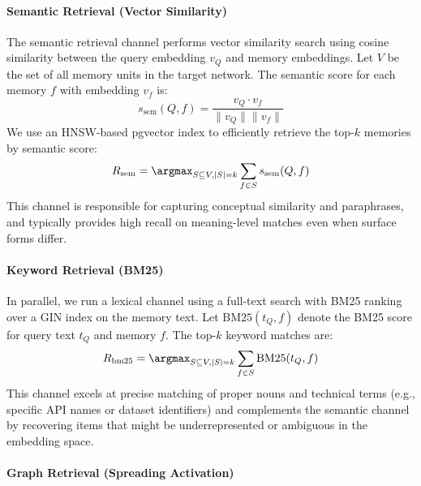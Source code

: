 \paragraph{Semantic Retrieval (Vector Similarity)}

The semantic retrieval channel performs vector similarity search using cosine similarity between the query embedding $v_Q$ and memory embeddings. Let $V$ be the set of all memory units in the target network. The semantic score for each memory $f$ with embedding $v_f$ is:
\begin{equation}
s_{\text{sem}}(Q, f) = \frac{v_Q \cdot v_f}{\|v_Q\| \|v_f\|}
\end{equation}
We use an HNSW-based pgvector index to efficiently retrieve the top-$k$ memories by semantic score:
\begin{equation}
R_{\text{sem}} = \argmax_{S \subseteq V, |S|=k} \sum_{f \in S} s_{\text{sem}}(Q, f)
\end{equation}
This channel is responsible for capturing conceptual similarity and paraphrases, and typically provides high recall on meaning-level matches even when surface forms differ.

\paragraph{Keyword Retrieval (BM25)}

In parallel, we run a lexical channel using a full-text search with BM25 ranking over a GIN index on the memory text. Let $\text{BM25}(t_Q, f)$ denote the BM25 score for query text $t_Q$ and memory $f$. The top-$k$ keyword matches are:
\begin{equation}
R_{\text{bm25}} = \argmax_{S \subseteq V, |S|=k} \sum_{f \in S} \text{BM25}(t_Q, f)
\end{equation}
This channel excels at precise matching of proper nouns and technical terms (e.g., specific API names or dataset identifiers) and complements the semantic channel by recovering items that might be underrepresented or ambiguous in the embedding space.

\paragraph{Graph Retrieval (Spreading Activation)}

